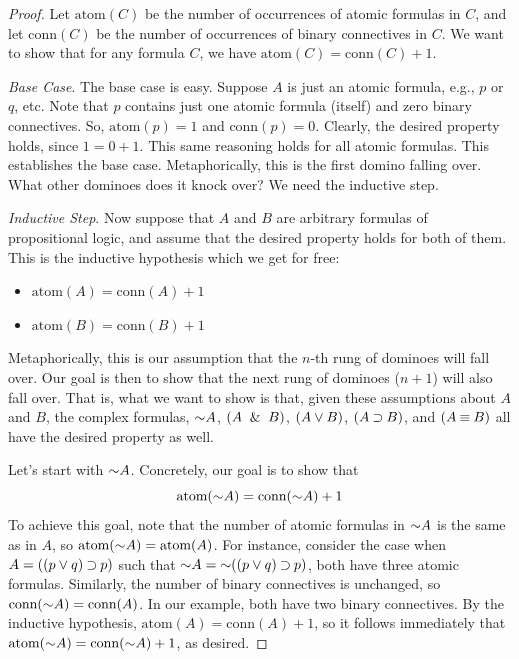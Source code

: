 \documentclass[options]{philosophersimprint}
\begin{document}
\begin{proof}
Let $\text{atom}(C)$ be the number of occurrences of atomic formulas in $C$, and let $\text{conn}(C)$ be the number of occurrences of binary connectives in $C$. We want to show that for any formula $C$, we have $\text{atom}(C) = \text{conn}(C) + 1$.

\textit{Base Case}. The base case is easy. Suppose $A$ is just an atomic formula, e.g., $p$ or $q$, etc. Note that $p$ contains just one atomic formula (itself) and zero binary connectives. So, $\text{atom}(p) = 1$ and $\text{conn}(p) = 0$. Clearly, the desired property holds, since $1 = 0 + 1$. This same reasoning holds for all atomic formulas. This establishes the base case. Metaphorically, this is the first domino falling over. What other dominoes does it knock over? We need the inductive step.

\textit{Inductive Step}. Now suppose that $A$ and $B$ are arbitrary formulas of propositional logic, and assume that the desired property holds for both of them. This is the inductive hypothesis which we get for free:
\begin{itemize}
    \item $\text{atom}(A) = \text{conn}(A) + 1$
    \item $\text{atom}(B) = \text{conn}(B) + 1$
\end{itemize}
Metaphorically, this is our assumption that the $n$-th rung of dominoes will fall over. Our goal is then to show that the next rung of dominoes ($n+1$) will also fall over. That is, what we want to show is that, given these assumptions about $A$ and $B$, the complex formulas, $\mathord{\sim} A$, $(A \ \mathbin{\&} \  B)$, $(A \mathbin{\vee} B)$, $(A \mathbin{\supset} B)$, and $(A \mathbin{\equiv} B)$ all have the desired property as well.

Let's start with $\mathord{\sim} A$. Concretely, our goal is to show that
$$\text{atom}(\mathord{\sim} A) = \text{conn}(\mathord{\sim} A) + 1$$
To achieve this goal, note that the number of atomic formulas in $\mathord{\sim} A$ is the same as in $A$, so $\text{atom}(\mathord{\sim} A) = \text{atom}(A)$. For instance, consider the case when $A=((p\mathbin{\vee} q)\mathbin{\supset} p)$ such that $\mathord{\sim} A=\mathord{\sim} ((p\mathbin{\vee} q)\mathbin{\supset} p)$, both have three atomic formulas. Similarly, the number of binary connectives is unchanged, so $\text{conn}(\mathord{\sim} A) = \text{conn}(A)$. In our example, both have two binary connectives. By the inductive hypothesis, $\text{atom}(A) = \text{conn}(A) + 1$, so it follows immediately that $\text{atom}(\mathord{\sim} A) = \text{conn}(\mathord{\sim} A) + 1$, as desired.


\end{proof}
\end{document}

